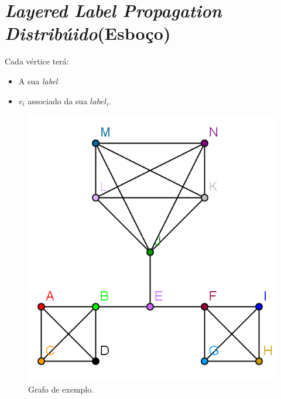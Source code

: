 \documentclass[a4paper,10pt]{report}
\title{}
\author{}
\begin{document}
\section*{\textit{Layered Label Propagation Distribúido}(Esboço)}

Cada vértice terá:
\begin{itemize}
  \item A sua \textit{label}
  \item $v_i$ associado da sua $label_i$.
\end{itemize}

\begin{figure}[h]
\center
\includegraphics{graph_step0}
\caption{Grafo de exemplo.\label{fig:distributedexample1}}
\end{figure}
\end{document}
